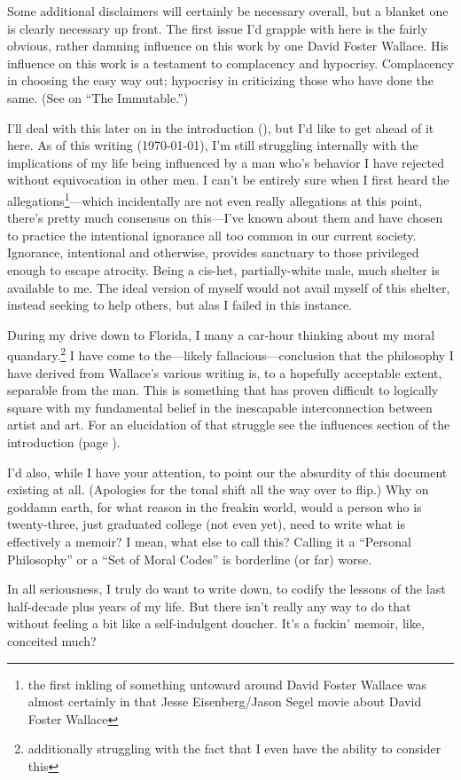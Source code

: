\vspace*{\fill}
{\normalsize Some additional disclaimers will certainly be necessary overall, but a blanket one is clearly necessary up front.
The first issue I'd grapple with here is the fairly obvious, rather damning influence on this work by one David Foster Wallace.
His influence on this work is a testament to complacency and hypocrisy.
Complacency in choosing the easy way out; hypocrisy in criticizing those who have done the same.
(See  on ``The Immutable.'')

I'll deal with this later on in the introduction (), but I'd like to get ahead of it here.
As of this writing (\today), I'm still struggling internally with the implications of my life being influenced by a man who's behavior I have rejected without equivocation in other men.
I can't be entirely sure when I first heard the allegations\footnote{the first inkling of something untoward around David Foster Wallace was almost certainly in that Jesse Eisenberg/Jason Segel movie about David Foster Wallace}---which incidentally are not even really allegations at this point, there's pretty much consensus on this---I've known about them and have chosen to practice the intentional ignorance all too common in our current society.
Ignorance, intentional and otherwise, provides sanctuary to those privileged enough to escape atrocity.
Being a cis-het, partially-white male, much shelter is available to me.
The ideal version of myself would not avail myself of this shelter, instead seeking to help others, but alas I failed in this instance.

During my drive down to Florida, I many a car-hour thinking about my moral quandary.\footnote{additionally struggling with the fact that I even have the ability to consider this}
I have come to the---likely fallacious---conclusion that the philosophy I have derived from Wallace's various writing is, to a hopefully acceptable extent, separable from the man.
This is something that has proven difficult to logically square with my fundamental belief in the inescapable interconnection between artist and art.
For an elucidation of that struggle see the influences section of the introduction (page \pageref{sec:influences}).

I'd also, while I have your attention, to point our the absurdity of this document existing at all.
(Apologies for the tonal shift all the way over to flip.)
Why on goddamn earth, for what reason in the freakin world, would a person who is twenty-three, just graduated college (not even yet), need to write what is effectively a memoir?
I mean, what else to call this?
Calling it a ``Personal Philosophy'' or a ``Set of Moral Codes'' is borderline (or far) worse.

In all seriousness, I truly do want to write down, to codify the lessons of the last half-decade plus years of my life.
But there isn't really any way to do that without feeling a bit like a self-indulgent doucher.
It's a fuckin' memoir, like, conceited much?}

